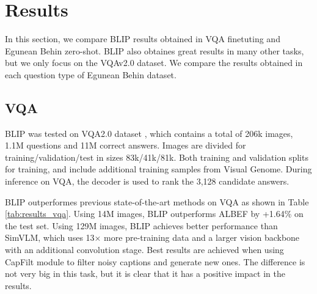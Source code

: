 \documentclass[11pt]{article}
\begin{document}
\section{Results}

In this section, we compare BLIP results obtained in VQA finetuting and Egunean Behin zero-shot. BLIP also obtaines great results in many other tasks, but we only focus on the VQAv2.0 dataset. We compare the results obtained in each question type of Egunean Behin dataset.

\subsection{VQA}

BLIP was tested on VQA2.0 dataset \cite{goyal2017making}, which contains a total of 206k images, 1.1M questions and 11M correct answers. Images are divided for training/validation/test in sizes 83k/41k/81k. Both training and validation splits for training, and include additional training samples from Visual Genome. During inference on VQA, the decoder is used to rank the 3,128 candidate answers.

BLIP outperformes previous state-of-the-art methods on VQA as shown in Table \ref{tab:results_vqa}. Using 14M images, BLIP outperforms ALBEF by +1.64\% on the test set. Using 129M images, BLIP achieves better performance than SimVLM, which uses 13× more pre-training data and a larger vision backbone with an additional convolution stage. Best results are achieved when using CapFilt module to filter noisy captions and generate new ones. The difference is not very big in this task, but it is clear that it has a positive impact in the results.
\end{document}
